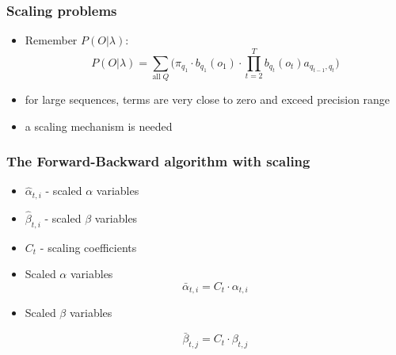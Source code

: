 \begin{frame}
  \frametitle{Scaling problems}
  \begin{itemize}
  \item Remember $P(O \vert \lambda)$:
    \begin{equation*}
      P(O \vert \lambda) =  \displaystyle\sum_{\text{all}\;Q} \Big( \pi_{q_1} \cdot
      b_{q_1}(o_1) \cdot \displaystyle\prod_{t=2}^{T} b_{q_t}(o_t)
      a_{q_{t-1},q_t} \Big)
    \end{equation*}
    \pause
  \item for large sequences, terms are very close to zero and exceed
    precision range
  \item a scaling mechanism is needed
  \end{itemize}
\end{frame}

\begin{frame}
  \frametitle{The Forward-Backward algorithm with scaling}
  \begin{itemize}
  \item $\hat{\alpha}_{t,i}$ - scaled $\alpha$ variables
  \item $\hat{\beta}_{t,i}$ - scaled $\beta$ variables \vspace*{1em}
  \item $C_t$ - scaling coefficients \vspace*{1em}
  \item Scaled $\alpha$ variables
    \begin{equation}
      \label{eq:scaled-alpha}
      \bar{\alpha}_{t,i} = C_t \cdot \alpha_{t,i}
    \end{equation}
  \item Scaled $\beta$ variables
    
    \begin{equation}
      \label{eq:scaled-beta}
      \bar{\beta}_{t,j} = C_t \cdot \beta_{t,j}
    \end{equation}
  \end{itemize}
\end{frame}

